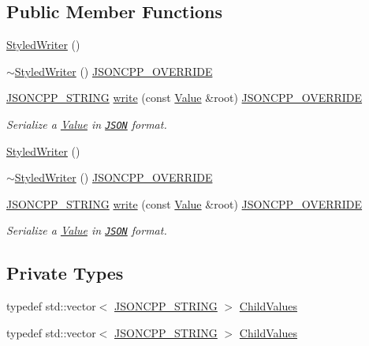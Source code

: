 \subsection*{Public Member Functions}
\begin{DoxyCompactItemize}
\item 
\hyperlink{class_json_1_1_styled_writer_a1f1b5f922a6a0ef0e56c6dd2f6170192}{Styled\+Writer} ()
\item 
\hyperlink{class_json_1_1_styled_writer_a6a18380a4c5dd5e37a892dc182aac88c}{$\sim$\+Styled\+Writer} () \hyperlink{config_8h_a824d6199c91488107e443226fa6022c5}{J\+S\+O\+N\+C\+P\+P\+\_\+\+O\+V\+E\+R\+R\+I\+DE}
\item 
\hyperlink{config_8h_a1e723f95759de062585bc4a8fd3fa4be}{J\+S\+O\+N\+C\+P\+P\+\_\+\+S\+T\+R\+I\+NG} \hyperlink{class_json_1_1_styled_writer_a5efab19b9746da9920c29cdae3a6b404}{write} (const \hyperlink{class_json_1_1_value}{Value} \&root) \hyperlink{config_8h_a824d6199c91488107e443226fa6022c5}{J\+S\+O\+N\+C\+P\+P\+\_\+\+O\+V\+E\+R\+R\+I\+DE}
\begin{DoxyCompactList}\small\item\em Serialize a \hyperlink{class_json_1_1_value}{Value} in \href{http://www.json.org}{\tt J\+S\+ON} format. \end{DoxyCompactList}\item 
\hyperlink{class_json_1_1_styled_writer_a1f1b5f922a6a0ef0e56c6dd2f6170192}{Styled\+Writer} ()
\item 
\hyperlink{class_json_1_1_styled_writer_a6a18380a4c5dd5e37a892dc182aac88c}{$\sim$\+Styled\+Writer} () \hyperlink{config_8h_a824d6199c91488107e443226fa6022c5}{J\+S\+O\+N\+C\+P\+P\+\_\+\+O\+V\+E\+R\+R\+I\+DE}
\item 
\hyperlink{config_8h_a1e723f95759de062585bc4a8fd3fa4be}{J\+S\+O\+N\+C\+P\+P\+\_\+\+S\+T\+R\+I\+NG} \hyperlink{class_json_1_1_styled_writer_a5efab19b9746da9920c29cdae3a6b404}{write} (const \hyperlink{class_json_1_1_value}{Value} \&root) \hyperlink{config_8h_a824d6199c91488107e443226fa6022c5}{J\+S\+O\+N\+C\+P\+P\+\_\+\+O\+V\+E\+R\+R\+I\+DE}
\begin{DoxyCompactList}\small\item\em Serialize a \hyperlink{class_json_1_1_value}{Value} in \href{http://www.json.org}{\tt J\+S\+ON} format. \end{DoxyCompactList}\end{DoxyCompactItemize}
\subsection*{Private Types}
\begin{DoxyCompactItemize}
\item 
typedef std\+::vector$<$ \hyperlink{config_8h_a1e723f95759de062585bc4a8fd3fa4be}{J\+S\+O\+N\+C\+P\+P\+\_\+\+S\+T\+R\+I\+NG} $>$ \hyperlink{class_json_1_1_styled_writer_a798fcefa41730de612a5cf7e73003e8a}{Child\+Values}
\item 
typedef std\+::vector$<$ \hyperlink{config_8h_a1e723f95759de062585bc4a8fd3fa4be}{J\+S\+O\+N\+C\+P\+P\+\_\+\+S\+T\+R\+I\+NG} $>$ \hyperlink{class_json_1_1_styled_writer_a798fcefa41730de612a5cf7e73003e8a}{Child\+Values}
\end{DoxyCompactItemize}
